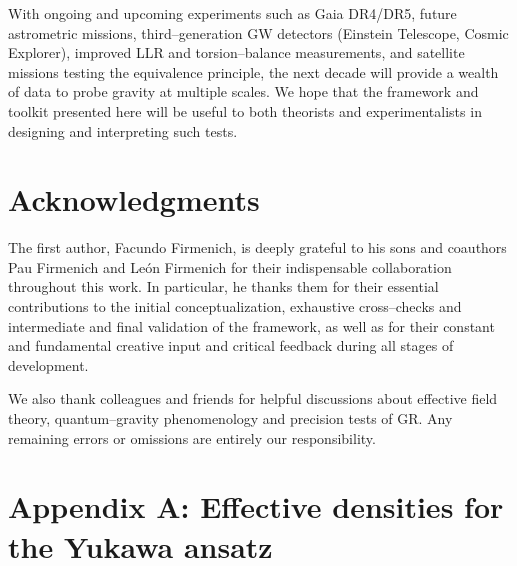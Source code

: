 \documentclass[11pt,a4paper]{article}
\begin{document}
With ongoing and upcoming experiments such as Gaia DR4/DR5, future astrometric missions, third--generation GW detectors (Einstein Telescope, Cosmic Explorer), improved LLR and torsion--balance measurements, and satellite missions testing the equivalence principle, the next decade will provide a wealth of data to probe gravity at multiple scales. We hope that the framework and toolkit presented here will be useful to both theorists and experimentalists in designing and interpreting such tests.

\section*{Acknowledgments}

The first author, Facundo Firmenich, is deeply grateful to his sons and coauthors Pau Firmenich and Le\'on Firmenich for their indispensable collaboration throughout this work. In particular, he thanks them for their essential contributions to the initial conceptualization, exhaustive cross--checks and intermediate and final validation of the framework, as well as for their constant and fundamental creative input and critical feedback during all stages of development. 

We also thank colleagues and friends for helpful discussions about effective field theory, quantum--gravity phenomenology and precision tests of GR. Any remaining errors or omissions are entirely our responsibility.

\appendix

\section*{Appendix A: Effective densities for the Yukawa ansatz}
\end{document}
